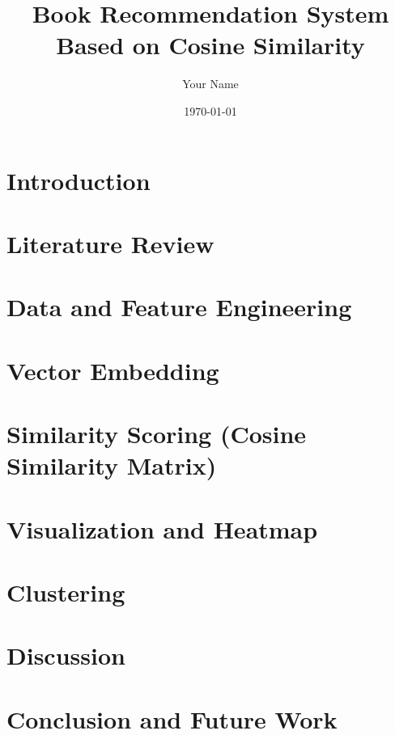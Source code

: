 \documentclass[12pt]{article}
\title{Book Recommendation System Based on Cosine Similarity}
\author{Your Name}
\date{\today}
\begin{document}
	
	\maketitle
	
	\begin{abstract}
		
	\end{abstract}
	
	\tableofcontents
	\newpage
	
	\section{Introduction}
	
	
	\section{Literature Review}
	
	
	\section{Data and Feature Engineering}
	
	
	\section{Vector Embedding}
	
	
	\section{Similarity Scoring (Cosine Similarity Matrix)}
	
	
	\section{Visualization and Heatmap}
	
	
	\section{Clustering} 
	
	
	\section{Discussion}
	
	
	\section{Conclusion and Future Work}
	
	
	
	
	
\end{document}
